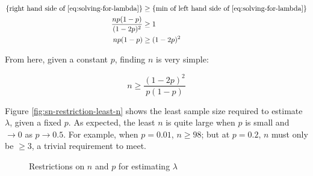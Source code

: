 \documentclass{article}
\begin{document}
\begin{align}
  \textnormal{\{right hand side of \eqref{eq:solving-for-lambda}\}} &\geq \textnormal{\{min of left hand side of \eqref{eq:solving-for-lambda}\}} \nonumber \\
  \frac{np(1-p)}{(1-2p)^2} &\geq 1 \nonumber \\
  np(1-p) &\geq (1-2p)^2 \label{eq:solving-the-restriction}
\end{align}

From here, given a constant $p$, finding $n$ is very simple:

\begin{equation}
  n \geq \frac{(1-2p)^2}{p(1-p)} \label{eq: n for a given p}
\end{equation}

Figure \ref{fig:sn-restriction-least-n} shows the least sample size required to
estimate $\lambda$, given a fixed $p$. As expected, the least $n$ is quite
large when $p$ is small and $\to 0$ as $p \to 0.5$. For example, when $p =
0.01$, $n \geq 98$; but at $p = 0.2$, $n$ must only be $\geq 3$, a trivial
requirement to meet.

\begin{figure}
  \centering
  \quad
  \caption{Restrictions on $n$ and $p$ for estimating $\lambda$}
  \label{fig:sn-restriction}
\end{figure}
\end{document}
